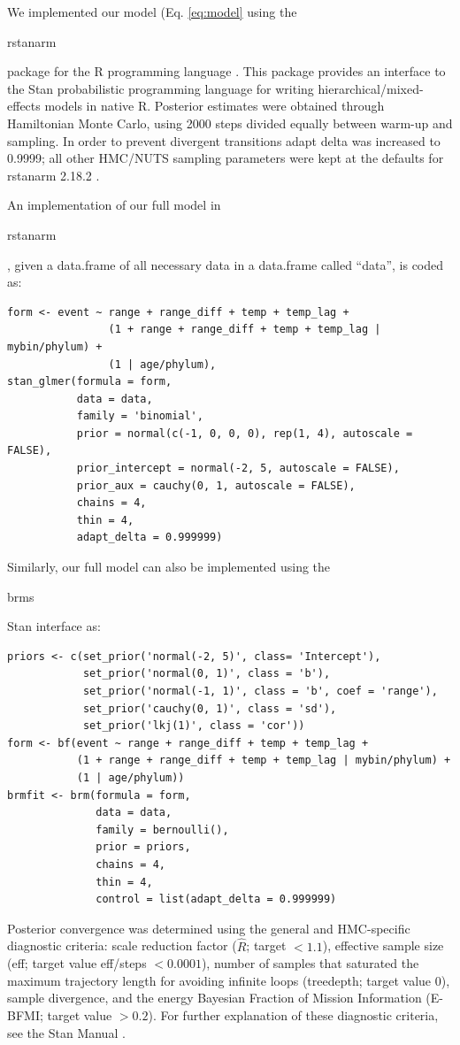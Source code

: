 \documentclass[12pt,letterpaper]{article}
\begin{document}
\begin{refsection}
We implemented our model (Eq. \ref{eq:model} using the \begin{texttt}rstanarm\end{texttt} package for the R programming language \citep{StanManual}. This package provides an interface to the Stan probabilistic programming language for writing hierarchical/mixed-effects models in native R. Posterior estimates were obtained through Hamiltonian Monte Carlo, using 2000 steps divided equally between warm-up and sampling. In order to prevent divergent transitions adapt delta was increased to 0.9999; all other HMC/NUTS sampling parameters were kept at the defaults for rstanarm 2.18.2 \citep{rstanarm}.

An implementation of our full model in \begin{texttt}rstanarm\end{texttt}, given a data.frame of all necessary data in a data.frame called ``data'', is coded as:
\begin{verbatim}
form <- event ~ range + range_diff + temp + temp_lag + 
                (1 + range + range_diff + temp + temp_lag | mybin/phylum) + 
                (1 | age/phylum), 
stan_glmer(formula = form,
           data = data, 
           family = 'binomial',
           prior = normal(c(-1, 0, 0, 0), rep(1, 4), autoscale = FALSE), 
           prior_intercept = normal(-2, 5, autoscale = FALSE), 
           prior_aux = cauchy(0, 1, autoscale = FALSE), 
           chains = 4,
           thin = 4,
           adapt_delta = 0.999999)
\end{verbatim}

Similarly, our full model can also be implemented using the \begin{texttt}brms\end{texttt} Stan interface \citep{brms2017,brms2018} as:
\begin{verbatim}
priors <- c(set_prior('normal(-2, 5)', class= 'Intercept'),
            set_prior('normal(0, 1)', class = 'b'),
            set_prior('normal(-1, 1)', class = 'b', coef = 'range'),
            set_prior('cauchy(0, 1)', class = 'sd'),
            set_prior('lkj(1)', class = 'cor'))
form <- bf(event ~ range + range_diff + temp + temp_lag +
           (1 + range + range_diff + temp + temp_lag | mybin/phylum) +
           (1 | age/phylum))
brmfit <- brm(formula = form,
              data = data, 
              family = bernoulli(), 
              prior = priors,
              chains = 4, 
              thin = 4,
              control = list(adapt_delta = 0.999999)
\end{verbatim}

Posterior convergence was determined using the general and HMC-specific diagnostic criteria: scale reduction factor (\(\hat{R}\); target \(<1.1\)), effective sample size (eff; target value eff/steps \(<0.0001\)), number of samples that saturated the maximum trajectory length for avoiding infinite loops (treedepth; target value 0), sample divergence, and the energy Bayesian Fraction of Mission Information (E-BFMI; target value \(>0.2\)). For further explanation of these diagnostic criteria, see the Stan Manual \citep{StanManual}.


\printbibliography[title={Supplementary References}]
\end{refsection}
\end{document}
